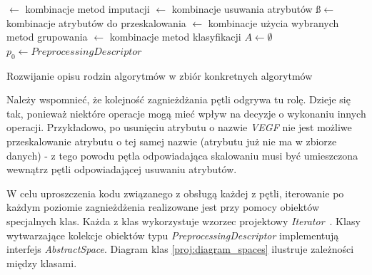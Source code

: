 \documentclass[../thesis.tex]{subfiles}
\begin{document}
\begin{algorithm}[ht]
  
  \is$\leftarrow$ kombinacje metod imputacji\;
  \rs$\leftarrow$ kombinacje usuwania atrybutów\;
  \ss$\leftarrow$ kombinacje atrybutów do przeskalowania\;
  \gs$\leftarrow$ kombinacje użycia wybranych metod grupowania\;
  \cs$\leftarrow$ kombinacje metod klasyfikacji\;
  \BlankLine
  $A \leftarrow \emptyset$\;
  $p_0 \leftarrow PreprocessingDescriptor$\;
  \caption{Rozwijanie opisu rodzin algorytmów w zbiór konkretnych algorytmów}
  \label{proj:algorithm_loops}
\end{algorithm}

Należy wspomnieć, że kolejność zagnieżdżania pętli odgrywa tu rolę. Dzieje się tak, ponieważ niektóre operacje mogą mieć wpływ na decyzje o wykonaniu innych operacji. Przykładowo, po usunięciu atrybutu o nazwie \emph{VEGF} nie jest możliwe przeskalowanie atrybutu o tej samej nazwie (atrybutu już nie ma w zbiorze danych) - z tego powodu pętla odpowiadająca skalowaniu musi być umieszczona wewnątrz pętli odpowiadającej usuwaniu atrybutów. 

W celu uproszczenia kodu związanego z obsługą każdej z pętli, iterowanie po każdym poziomie zagnieżdżenia realizowane jest przy pomocy obiektów specjalnych klas. Każda z klas wykorzystuje wzorzec projektowy \emph{Iterator}~\cite{gang_of_four}. Klasy wytwarzające kolekcje obiektów typu \emph{PreprocessingDescriptor} implementują interfejs \emph{AbstractSpace}. Diagram klas \ref{proj:diagram_spaces} ilustruje zależności między klasami.
\end{document}
